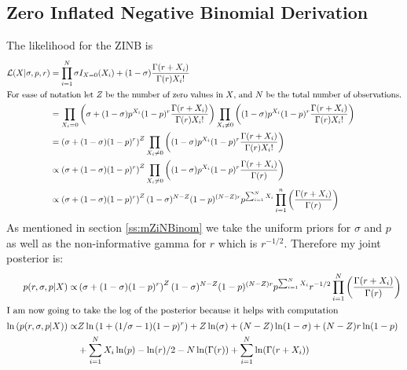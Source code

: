 \documentclass{article}
\begin{document}
\subsection{Zero Inflated Negative Binomial Derivation}
\label{a:dZINB}
The likelihood for the ZINB is 
\begin{align*}
\mathcal{L}(X|\sigma, p, r) &= \prod_{i=1}^N \sigma I_{X=0}(X_i) + (1-\sigma)\frac{\Gamma(r+X_i)}{\Gamma(r)X_i!}\\
\intertext{For ease of notation let $Z$ be the number of zero values in $X$, and $N$ be the total number of observations.}
&=\prod_{X_i=0}\left(\sigma + (1-\sigma)p^{X_i}(1-p)^r\frac{\Gamma(r+X_i)}{\Gamma(r)X_i!}\right)\prod_{X_i\ne 0}\left((1-\sigma)p^{X_i}(1-p)^r\frac{\Gamma(r+X_i)}{\Gamma(r)X_i!}\right)\\
&=\left(\sigma + (1-\sigma)(1-p)^r\right)^Z\prod_{X_i\ne 0}\left((1-\sigma)p^{X_i}(1-p)^r\frac{\Gamma(r+X_i)}{\Gamma(r)X_i!}\right)\\
&\propto\left(\sigma + (1-\sigma)(1-p)^r\right)^Z\prod_{X_i\ne 0}\left((1-\sigma)p^{X_i}(1-p)^r\frac{\Gamma(r+X_i)}{\Gamma(r)}\right)\\
&\propto\left(\sigma + (1-\sigma)(1-p)^r\right)^Z(1-\sigma)^{N-Z}(1-p)^{(N-Z)r}p^{\sum_{i=1}^NX_i}\prod_{i=1}^n\left(\frac{\Gamma(r+X_i)}{\Gamma(r)}\right)
\end{align*}
As mentioned in section \ref{ss:mZiNBinom} we take the uniform priors for $\sigma$ and $p$ as well as the non-informative gamma for $r$ which is $r^{-1/2}$. Therefore my joint posterior is:
\begin{align*}
p(r,\sigma, p|X)\propto&\left(\sigma + (1-\sigma)(1-p)^r\right)^Z(1-\sigma)^{N-Z}(1-p)^{(N-Z)r}p^{\sum_{i=1}^NX_i}r^{-1/2}\prod_{i=1}^N\left(\frac{\Gamma(r+X_i)}{\Gamma(r)}\right)\\
\intertext{I am now going to take the log of the posterior because it helps with computation}
\ln\left(p(r,\sigma, p|X)\right)\propto&Z\ln\left(1 + (1/\sigma-1)(1-p)^r\right) + Z\ln(\sigma) + (N-Z)\ln(1-\sigma)+(N-Z)r\ln(1-p)\\
&+\sum_{i=1}^NX_i\ln(p)-\ln(r)/2-N\ln(\Gamma(r))+\sum_{i=1}^N\ln(\Gamma(r+X_i))
\end{align*}
\end{document}
